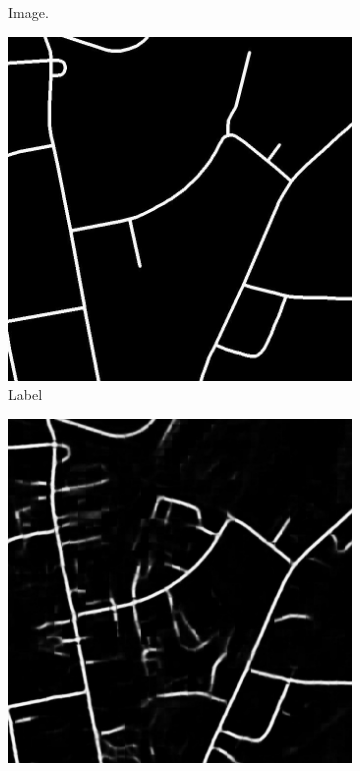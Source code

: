 \begin{figure}[H]
\begin{subfigure}{0.23\textwidth}
\caption{ Image.}
\vspace{0.2cm} %
\end{subfigure}
\hspace*{\fill} %
\begin{subfigure}{0.23\textwidth}
\includegraphics[width=\textwidth]{figs/appendix/label11728825_15.jpg}
\caption{Label}
\vspace{0.2cm} %
\end{subfigure}
\hspace*{\fill} %
\begin{subfigure}{0.23\textwidth}
\includegraphics[width=\textwidth]{figs/appendix/pred11728825_15.jpg}

\end{subfigure}
\end{figure}
